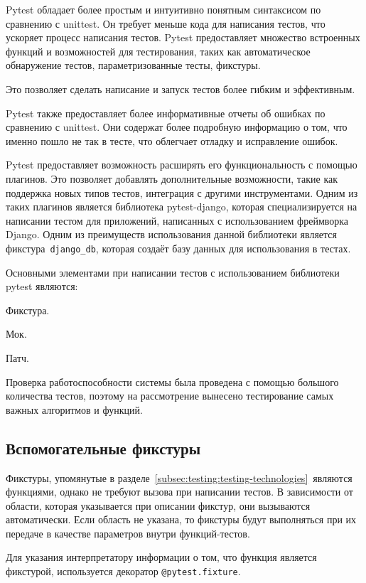Pytest обладает более простым и интуитивно понятным синтаксисом по сравнению с unittest.
Он требует меньше кода для написания тестов, что ускоряет процесс написания тестов.
Pytest предоставляет множество встроенных функций и возможностей для тестирования, таких как
автоматическое обнаружение тестов, параметризованные тесты, фикстуры.

Это позволяет сделать написание и запуск тестов более гибким и эффективным.

Pytest также предоставляет более информативные отчеты об ошибках по сравнению с unittest.
Они содержат более подробную информацию о том, что именно пошло не так в тесте, что облегчает отладку и исправление ошибок.

Pytest предоставляет возможность расширять его функциональность с помощью плагинов.
Это позволяет добавлять дополнительные возможности, такие как поддержка новых типов тестов, интеграция с другими инструментами.
Одним из таких плагинов является библиотека pytest-django, которая специализируется на написании тестом для приложений, написанных с использованием фреймворка Django.
Одним из преимуществ использования данной библиотеки является фикстура~\lstinline{django_db}, которая создаёт базу данных для использования в тестах.

Основными элементами при написании тестов с использованием библиотеки pytest являются:
\begin{enumerate_num}
    \item Фикстура.
    \item Мок.
    \item Патч.
\end{enumerate_num}

Проверка работоспособности системы была проведена с помощью большого количества тестов, поэтому на рассмотрение вынесено тестирование самых важных алгоритмов и функций.

\subsection{Вспомогательные фикстуры}\label{subsec:testing:fixtures}
Фикстуры, упомянутые в разделе~\ref{subsec:testing:testing-technologies}~являются функциями, однако не требуют вызова при написании тестов.
В зависимости от области, которая указывается при описании фикстур, они вызываются автоматически.
Если область не указана, то фикстуры будут выполняться при их передаче в качестве параметров внутри функций-тестов.

Для указания интерпретатору информации о том, что функция является фикстурой, используется декоратор \lstinline{@pytest.fixture}.

